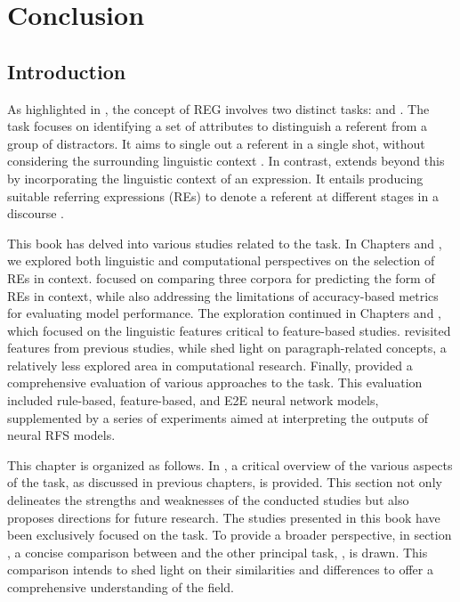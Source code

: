 \chapter{Conclusion}\label{chap8}

\section{Introduction}\label{chap8:sec:intro}

As highlighted in , the concept of REG involves two distinct tasks: \shot and \context. The \shot task focuses on identifying a set of attributes to distinguish a referent from a group of distractors. It aims to single out a referent in a single shot, without considering the surrounding linguistic context \citep{krahmer2012computational}. In contrast, \context extends beyond this by incorporating the linguistic context of an expression. It entails producing suitable referring expressions (REs) to denote a referent at different stages in a discourse \citep{belz2007generation}.

This book has delved into various studies related to the \context task. In Chapters \2 and \3, we explored both linguistic and computational perspectives on the selection of REs in context.  focused on comparing three corpora for predicting the form of REs in context, while also addressing the limitations of accuracy-based metrics for evaluating model performance. The exploration continued in Chapters \5 and \6, which focused on the linguistic features critical to feature-based \context studies.  revisited features from previous studies, while  shed light on paragraph-related concepts, a relatively less explored area in computational research. Finally,  provided a comprehensive evaluation of various approaches to the task. This evaluation included rule-based, feature-based, and E2E neural network models, supplemented by a series of experiments aimed at interpreting the outputs of neural RFS models.

This chapter is organized as follows. In , a critical overview of the various aspects of the \context task, as discussed in previous chapters, is provided. This section not only delineates the strengths and weaknesses of the conducted studies but also proposes directions for future research. The studies presented in this book have been exclusively focused on the \context task. To provide a broader perspective, in section , a concise comparison between \context and the other principal task, \shot, is drawn. This comparison intends to shed light on their similarities and differences to offer a comprehensive understanding of the field.

